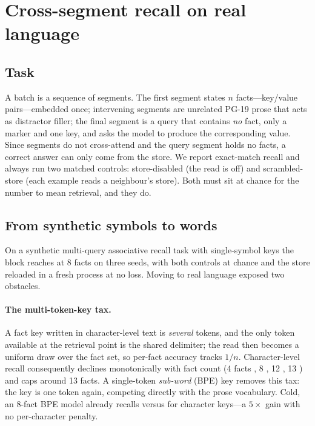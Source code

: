 \section{Cross-segment recall on real language}
\label{sec:language}

\subsection{Task}

A batch is a sequence of segments. The first segment states $n$ facts---key/value
pairs---embedded once; intervening segments are unrelated PG-19 prose that acts as
distractor filler; the final segment is a query that contains \emph{no} fact, only
a marker and one key, and asks the model to produce the corresponding value. Since
segments do not cross-attend and the query segment holds no facts, a correct answer
can only come from the store. We report exact-match recall and always run two
matched controls: store-disabled (the read is off) and scrambled-store (each
example reads a neighbour's store). Both must sit at chance for the number to mean
retrieval, and they do.

\subsection{From synthetic symbols to words}

On a synthetic multi-query associative recall task with single-symbol keys the
block reaches  at 8 facts on three seeds, with both controls at
chance and the store reloaded in a fresh process at no loss. Moving to real
language exposed two obstacles.

\paragraph{The multi-token-key tax.} A fact key written in character-level text is
\emph{several} tokens, and the only token available at the retrieval point is the
shared delimiter; the read then becomes a uniform draw over the fact set, so
per-fact accuracy tracks $1/n$. Character-level recall consequently declines
monotonically with fact count (4 facts , 8 , 12 ,
13 ) and caps around 13 facts. A single-token \emph{sub-word} (BPE)
key removes this tax: the key is one token again, competing directly with the
prose vocabulary. Cold, an 8-fact BPE model already recalls  versus
 for character keys---a $5\times$ gain with no per-character penalty.

